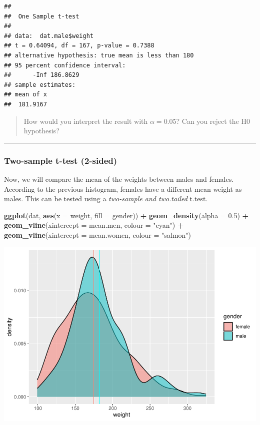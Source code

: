 \documentclass[
]{book}
\newenvironment{Shaded}{\begin{snugshade}}{\end{snugshade}}
\newcommand{\AttributeTok}[1]{\textcolor[rgb]{0.13,0.29,0.53}{#1}}
\newcommand{\FloatTok}[1]{\textcolor[rgb]{0.00,0.00,0.81}{#1}}
\newcommand{\FunctionTok}[1]{\textcolor[rgb]{0.13,0.29,0.53}{\textbf{#1}}}
\newcommand{\NormalTok}[1]{#1}
\newcommand{\SpecialCharTok}[1]{\textcolor[rgb]{0.81,0.36,0.00}{\textbf{#1}}}
\newcommand{\StringTok}[1]{\textcolor[rgb]{0.31,0.60,0.02}{#1}}
\begin{document}
\begin{verbatim}
## 
##  One Sample t-test
## 
## data:  dat.male$weight
## t = 0.64094, df = 167, p-value = 0.7388
## alternative hypothesis: true mean is less than 180
## 95 percent confidence interval:
##      -Inf 186.8629
## sample estimates:
## mean of x 
##  181.9167
\end{verbatim}

\begin{quote}
How would you interpret the result with \(\alpha=0.05\)?
Can you reject the H0 hypothesis?
\end{quote}

\begin{center}\rule{0.5\linewidth}{0.5pt}\end{center}

\hypertarget{two-sample-t-test-2-sided}{%
\subsubsection{Two-sample t-test (2-sided)}\label{two-sample-t-test-2-sided}}

Now, we will compare the mean of the weights between males and females.\\

According to the previous histogram, females have a different mean weight as males.
This can be tested using a \emph{two-sample and two.tailed} t.test.

\begin{Shaded}
\begin{Highlighting}[]
\FunctionTok{ggplot}\NormalTok{(dat,}
       \FunctionTok{aes}\NormalTok{(}\AttributeTok{x =}\NormalTok{ weight, }
           \AttributeTok{fill =}\NormalTok{ gender)) }\SpecialCharTok{+}
  \FunctionTok{geom\_density}\NormalTok{(}\AttributeTok{alpha =} \FloatTok{0.5}\NormalTok{) }\SpecialCharTok{+}
  \FunctionTok{geom\_vline}\NormalTok{(}\AttributeTok{xintercept =}\NormalTok{ mean.men, }\AttributeTok{colour =} \StringTok{"cyan"}\NormalTok{) }\SpecialCharTok{+}
  \FunctionTok{geom\_vline}\NormalTok{(}\AttributeTok{xintercept =}\NormalTok{ mean.women, }\AttributeTok{colour =} \StringTok{"salmon"}\NormalTok{)}
\end{Highlighting}
\end{Shaded}

\includegraphics{_main_files/figure-latex/unnamed-chunk-124-1.pdf}
\end{document}
